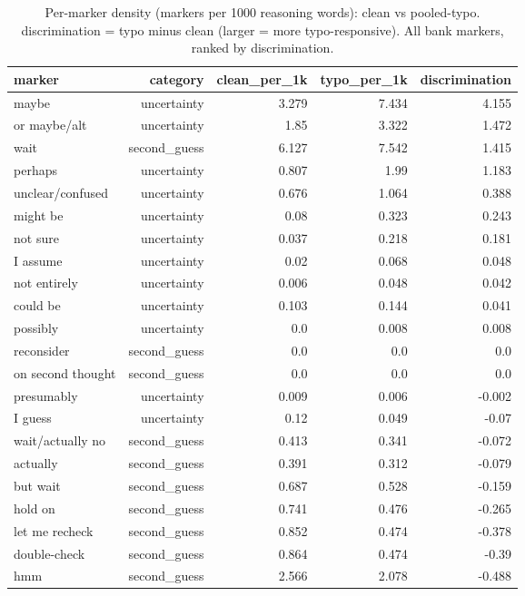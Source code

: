 \documentclass[11pt]{article}
\begin{document}
\begin{table}[H]
\centering
\caption{Per-marker density (markers per 1000 reasoning words): clean vs pooled-typo. discrimination = typo minus clean (larger = more typo-responsive). All bank markers, ranked by discrimination.}
\small
\begin{adjustbox}{max width=\textwidth}
\begin{tabular}{lrrrr}
\toprule
\textbf{marker} & \textbf{category} & \textbf{clean\_per\_1k} & \textbf{typo\_per\_1k} & \textbf{discrimination} \\
\midrule
maybe & uncertainty & 3.279 & 7.434 & 4.155 \\
or maybe/alt & uncertainty & 1.85 & 3.322 & 1.472 \\
wait & second\_guess & 6.127 & 7.542 & 1.415 \\
perhaps & uncertainty & 0.807 & 1.99 & 1.183 \\
unclear/confused & uncertainty & 0.676 & 1.064 & 0.388 \\
might be & uncertainty & 0.08 & 0.323 & 0.243 \\
not sure & uncertainty & 0.037 & 0.218 & 0.181 \\
I assume & uncertainty & 0.02 & 0.068 & 0.048 \\
not entirely & uncertainty & 0.006 & 0.048 & 0.042 \\
could be & uncertainty & 0.103 & 0.144 & 0.041 \\
possibly & uncertainty & 0.0 & 0.008 & 0.008 \\
reconsider & second\_guess & 0.0 & 0.0 & 0.0 \\
on second thought & second\_guess & 0.0 & 0.0 & 0.0 \\
presumably & uncertainty & 0.009 & 0.006 & -0.002 \\
I guess & uncertainty & 0.12 & 0.049 & -0.07 \\
wait/actually no & second\_guess & 0.413 & 0.341 & -0.072 \\
actually & second\_guess & 0.391 & 0.312 & -0.079 \\
but wait & second\_guess & 0.687 & 0.528 & -0.159 \\
hold on & second\_guess & 0.741 & 0.476 & -0.265 \\
let me recheck & second\_guess & 0.852 & 0.474 & -0.378 \\
double-check & second\_guess & 0.864 & 0.474 & -0.39 \\
hmm & second\_guess & 2.566 & 2.078 & -0.488 \\
\bottomrule
\end{tabular}
\end{adjustbox}
\end{table}
\end{document}
